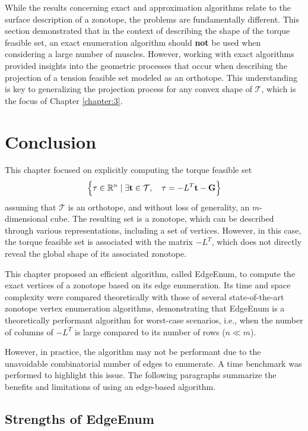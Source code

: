 While the results concerning exact and approximation algorithms relate to the surface description of a zonotope, the problems are fundamentally different. This section demonstrated that in the context of describing the shape of the torque feasible set, an exact enumeration algorithm should \textbf{not} be used when considering a large number of muscles. However, working with exact algorithms provided insights into the geometric processes that occur when describing the projection of a tension feasible set modeled as an orthotope. This understanding is key to generalizing the projection process for any convex shape of $\mathcal{T}$, which is the focus of Chapter \ref{chapter:3}.

\section{Conclusion}
\label{conclusion_zonotope_enum_algorithm}
This chapter focused on explicitly computing the torque feasible set 
\begin{align*}
    \left\{\tau \in \mathbb{R}^n \mid \exists \mathbf{t}\in\mathcal{T}, \quad \tau = -L^T\mathbf{t} - \mathbf{G}\right\}
\end{align*}
assuming that $\mathcal{T}$ is an orthotope, and without loss of generality, an $m$-dimensional cube. The resulting set is a zonotope, which can be described through various representations, including a set of vertices. However, in this case, the torque feasible set is associated with the matrix $-L^T$, which does not directly reveal the global shape of its associated zonotope. 

This chapter proposed an efficient algorithm, called EdgeEnum, to compute the exact vertices of a zonotope based on its edge enumeration. Its time and space complexity were compared theoretically with those of several state-of-the-art zonotope vertex enumeration algorithms, demonstrating that EdgeEnum is a theoretically performant algorithm for worst-case scenarios, i.e., when the number of columns of $-L^T$ is large compared to its number of rows ($n\ll m$).

However, in practice, the algorithm may not be performant due to the unavoidable combinatorial number of edges to enumerate. A time benchmark was performed to highlight this issue. The following paragraphs summarize the benefits and limitations of using an edge-based algorithm.

\subsection*{Strengths of EdgeEnum}

